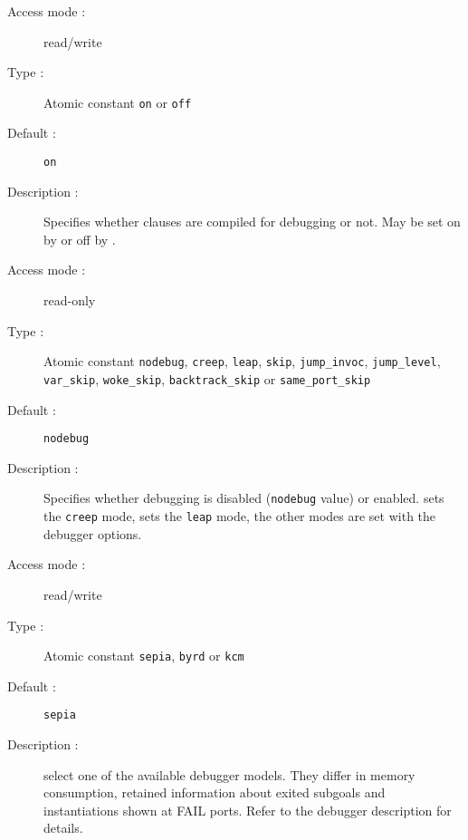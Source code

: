 \begin{description}
\pagebreak[3]
\begin{description}
\item[Access mode : ] read/write 
\item[Type : ] Atomic constant {\tt on} or {\tt off} 
\item[Default : ] {\tt on}
\item[Description : ] Specifies whether clauses are compiled for debugging or 
not. May be set on by  or off by .
\end{description}

\begin{description}
\item[Access mode :] read-only
\item[Type :] Atomic constant {\tt nodebug}, {\tt creep}, {\tt leap}, {\tt skip}, {\tt jump_invoc}, {\tt jump_level}, {\tt var_skip}, {\tt woke_skip}, {\tt backtrack_skip} or {\tt same_port_skip}
\item[Default : ] {\tt nodebug}
\item[Description :] Specifies whether debugging is disabled
({\tt nodebug} value)
or enabled.  sets the {\tt creep} mode,  sets the 
{\tt leap} mode, the other modes are set with the debugger options.
\end{description}

\begin{description}
\item[Access mode :] read/write
\item[Type :] Atomic constant {\tt sepia}, {\tt byrd} or {\tt kcm}
\item[Default : ] {\tt sepia}
\item[Description :] select one of the available debugger models.
They differ in memory consumption, retained information about exited subgoals
and instantiations shown at FAIL ports. Refer to the debugger description
for details.
\end{description}



\end{description}
